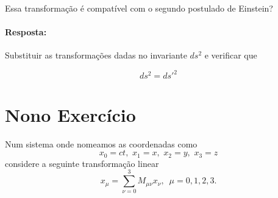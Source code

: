 \documentclass[10pt,a4paper]{article}
\begin{document}
	Essa transformação é compatível com o segundo postulado de Einstein? 
	
	\paragraph{Resposta:} Substituir as transformações dadas no invariante $ds^2$ e verificar que 
	
	\begin{equation*}
	 ds^2 = ds'^2
	\end{equation*}
	
	\section{Nono Exercício}
	Num sistema onde nomeamos as coordenadas como
	$$x_0 = ct,\,\,x_1 =x,\,\,x_2=y,\,\,x_3=z$$
	considere a seguinte transformação linear
	$$x_\mu = \sum_{\nu=0}^{3} M_{\mu\nu} x_\nu,\,\,\,\mu =0,1,2,3.$$
\end{document}
